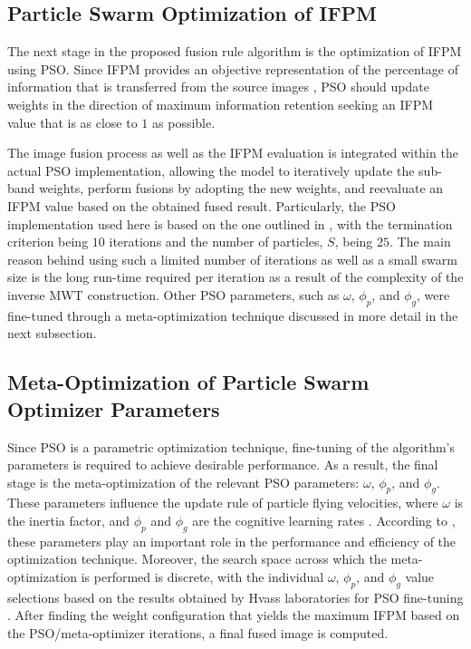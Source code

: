 \documentclass{article}
\begin{document}
\subsection{Particle Swarm Optimization of IFPM}
The next stage in the proposed fusion rule algorithm is the optimization of IFPM using PSO. Since IFPM provides an objective representation of the percentage of information that is transferred from the source images \cite{ifpm}, PSO should update weights in the direction of maximum information retention seeking an IFPM value that is as close to $1$ as possible.

The image fusion process as well as the IFPM evaluation is integrated within the actual PSO implementation, allowing the model to iteratively update the sub-band weights, perform fusions by adopting the new weights, and reevaluate an IFPM value based on the obtained fused result. Particularly, the PSO implementation used here is based on the one outlined in \cite{Zhang.Wang.Ji.2015}, with the termination criterion being $10$ iterations and the number of particles, $S$, being $25$. The main reason behind using such a limited number of iterations as well as a small swarm size is the long run-time required per iteration as a result of the complexity of the inverse MWT construction. Other PSO parameters, such as $\omega$, $\phi_{p}$, and $\phi_{g}$, were fine-tuned through a meta-optimization technique discussed in more detail in the next subsection.

\subsection{Meta-Optimization of Particle Swarm Optimizer Parameters}
Since PSO is a parametric optimization technique, fine-tuning of the algorithm's parameters is required to achieve desirable performance. As a result, the final stage is the meta-optimization of the relevant PSO parameters: $\omega$, $\phi_{p}$, and $\phi_{g}$. These parameters influence the update rule of particle flying velocities, where $\omega$ is the inertia factor, and $\phi_{p}$ and $\phi_{g}$ are the cognitive learning rates \cite{PSOParam}. According to \cite{PSOParam}, these parameters play an important role in the performance and efficiency of the optimization technique. Moreover, the search space across which the meta-optimization is performed is discrete, with the individual $\omega$, $\phi_{p}$, and $\phi_{g}$ value selections based on the results obtained by Hvass laboratories for PSO fine-tuning \cite{Hvass.2010}. After finding the weight configuration that yields the maximum IFPM based on the PSO/meta-optimizer iterations, a final fused image is computed.
\end{document}
